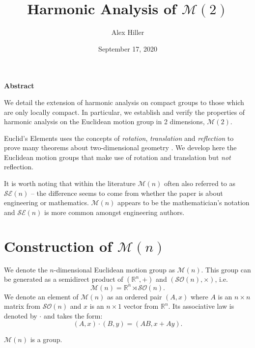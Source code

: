\documentclass{article}
\author{Alex Hiller}
\title{Harmonic Analysis of $\mathcal{M}(2)$}
\date{September 17, 2020}
\begin{document}
\maketitle
\begin{center}
    \textbf{Abstract}
\end{center}
We detail the extension of harmonic analysis on compact groups to those which are only locally compact. In particular, we establish and verify the properties of harmonic analysis on the Euclidean motion group in 2 dimensions, $\mathcal{M}(2)$.

\clearpage

Euclid's Elements uses the concepts of \textit{rotation}, \textit{translation} and \textit{reflection} to prove many theorems about two-dimensional geometry \cite{euclids_elements}. We develop here the Euclidean motion groups that make use of {rotation} and {translation} but \textit{not} reflection. \par
It is worth noting that within the literature $\mathcal{M}(n)$ often also referred to as $\mathcal{SE}(n)$ -- the difference seems to come from whether the paper is about engineering or mathematics. $\mathcal{M}(n)$ appears to be the mathematician's notation and $\mathcal{SE}(n)$ is more common amongst engineering authors.
\section{Construction of $\mathcal{M}(n)$} 
\begin{define}
    We denote the $n$-dimensional Euclidean motion group as $\mathcal{M}(n)$. This group can be generated as a semidirect product of $(\mathbb{R}^{n},+)$ and $(\mathcal{SO}(n), \times)$, i.e. \[\mathcal{M}(n) = \mathbb{R}^{n} \rtimes \mathcal{SO}(n).\] We denote an element of $\mathcal{M}(n)$ as an ordered pair $(A, x)$ where $A$ is an $n \times n$ matrix from $\mathcal{SO}(n)$ and $x$ is an $n \times 1$ vector from $\mathbb{R}^{n}$. Its associative law is denoted by $\cdot$ and takes the form: \[ (A,x)\cdot (B,y) = (AB, x+Ay) .\]
\end{define}
\begin{theorem}
    $\mathcal{M}(n)$ is a group. 
\end{theorem}
\end{document}
